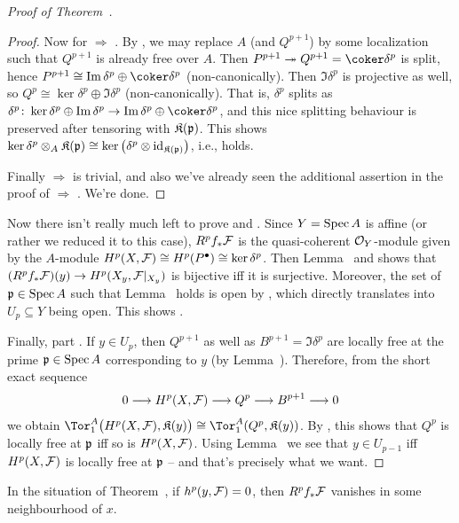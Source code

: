 \documentclass[a4paper,parskip=half,numbers=enddot, DIV=12]{scrreprt}
\begin{document}
\begin{proof}[Proof of Theorem~]
\begin{proof}
	Now for  $\Rightarrow$ . By \cite[Corollary~1.5.1]{alg2}, we may replace $A$ (and $Q^{p+1}$) by some localization such that $Q^{p+1}$ is already free over $A$. Then $P^{p+1}\epimorphism Q^{p+1}=\coker\delta^p$ is split, hence $P^{p+1}\cong \Im\delta^p\oplus \coker\delta^p$ (non-canonically). Then $\Im\delta^p$ is projective as well, so $Q^p\cong \ker\delta^p\oplus\Im\delta^p$ (non-canonically). That is, $\delta^p$ splits as $\delta^p\colon \ker\delta^p\oplus\Im\delta^p\morphism\Im\delta^p\oplus\coker\delta^p$, and this nice splitting behaviour is preserved after tensoring with $\mathfrak{K}(\mathfrak{p})$. This shows $\ker\delta^p\otimes_A\mathfrak{K}(\mathfrak{p})\cong \ker\left(\delta^p\otimes\operatorname{id}_{\mathfrak{K}(\mathfrak{p})}\right)$, i.e.,  holds.
	
	Finally  $\Rightarrow$  is trivial, and also we've already seen the additional assertion in the proof of  $\Rightarrow$ . We're done.
\end{proof}

	Now there isn't really much left to prove  and . Since $Y=\operatorname{Spec} A$ is affine (or rather we reduced it to this case), $R^pf_*\mathcal{F}$ is the quasi-coherent $\mathcal{O}_Y$-module given by the $A$-module $H^p(X,\mathcal{F})\cong H^p(P^\bullet)\cong \ker\delta^p$. Then Lemma~ and  shows that $(R^pf_*\Ff)(y)\morphism H^p(X_y,\Ff|_{X_y})$ is bijective iff it is surjective. Moreover, the set of $\mathfrak{p}\in\operatorname{Spec} A$ such that Lemma~ holds is open by \cite[Corollary~1.5.1]{alg2}, which directly translates into $U_p\subseteq Y$ being open. This shows .
	
	Finally, part . If $y\in U_p$, then $Q^{p+1}$ as well as $B^{p+1}=\Im \delta^p$ are locally free at the prime $\mathfrak{p}\in\operatorname{Spec} A$ corresponding to $y$ (by Lemma~). Therefore, from the short exact sequence
	\begin{align*}
		0\morphism H^p(X,\Ff)\morphism Q^p\morphism B^{p+1}\morphism 0
	\end{align*}
	we obtain $\Tor_1^A\big(H^p(X,\Ff),\KK(y)\big)\cong \Tor_1^A(Q^p,\KK(y))$. By \cite[Proposition~1.3.1]{homalg}, this shows that $Q^p$ is locally free at $\mathfrak{p}$ iff so is $H^p(X,\mathcal{F})$. Using Lemma~ we see that $y\in U_{p-1}$ iff $H^p(X,\mathcal{F})$ is locally free at $\mathfrak{p}$ -- and that's precisely what we want.
\end{proof}
\begin{cor}
	In the situation of Theorem~, if $h^p(y,\mathcal{F})=0$, then $R^pf_*\mathcal{F}$ vanishes in some neighbourhood of $x$.
\end{cor}
\end{document}

